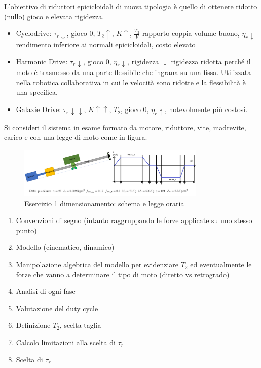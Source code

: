L'obiettivo di riduttori epicicloidali di nuova tipologia è quello di ottenere ridotto (nullo) gioco e elevata rigidezza.
\begin{itemize}
    \item Cyclodrive: \( \tau_r \downarrow \), gioco 0, \( T_2 \uparrow \), \( K \uparrow \), \( \frac{T_2}{V} \) rapporto coppia volume buono, \( \eta_r \downarrow \) rendimento inferiore ai normali epicicloidali, costo elevato
    \item Harmonic Drive: \( \tau_r \downarrow \), gioco 0, \( \eta_r \downarrow \), rigidezza \( \downarrow \) rigidezza ridotta perché il moto è trasmesso da una parte flessibile che ingrana su una fissa. Utilizzata nella robotica collaborativa in cui le velocità sono ridotte e la flessibilità è una specifica.
    \item Galaxie Drive: \( \tau_r \downarrow\downarrow\), \( K \uparrow\uparrow \), \( T_2 \), gioco 0, \( \eta_r \uparrow \), notevolmente più costosi.
\end{itemize}

Si consideri il sistema in esame formato da motore, riduttore, vite, madrevite, carico e con una legge di moto come in figura.\label{EsercizioDimRid}

\begin{figure}[h]
    \centering
    \includegraphics[width=0.8\textwidth]{Immagini/esercizio1_dim_rid_vite.png}
    \caption{Esercizio 1 dimensionamento: schema e legge oraria}
\end{figure}

\begin{enumerate}[label=\roman*.]
    \item Convenzioni di segno (intanto raggruppando le forze applicate su uno stesso punto)
    \item Modello (cinematico, dinamico)
    \item Manipolazione algebrica del modello per evidenziare $T_2$ ed eventualmente le forze che vanno a determinare il tipo di moto (diretto vs retrogrado)
    \item Analisi di ogni fase
    \item Valutazione del duty cycle
    \item Definizione $T_2$, scelta taglia
    \item Calcolo limitazioni alla scelta di $\tau_r$
    \item Scelta di $\tau_r$
\end{enumerate}

